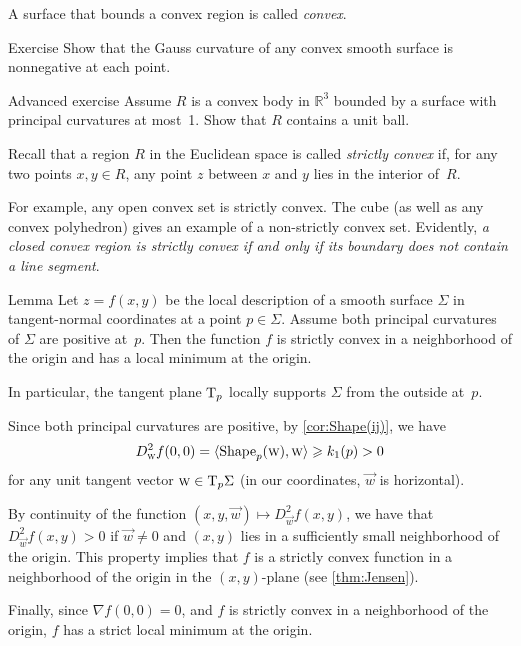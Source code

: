 A surface that bounds a convex region is called \emph{convex}.

\begin{thm}{Exercise}\label{ex:convex-surf}
Show that the Gauss curvature of any convex smooth surface is nonnegative at each point.
\end{thm}

\begin{thm}{Advanced exercise}\label{ex:convex-lagunov}
Assume $R$ is a convex body in $\mathbb{R}^3$ bounded by a surface with principal curvatures at most~1.
Show that $R$ contains a unit ball.
\end{thm}

Recall that a region $R$ in the Euclidean space is called  {}\emph{strictly convex} if, for any two points $x,y\in R$, any point $z$ between $x$ and $y$ lies in the interior of~$R$.

For example, any open convex set is strictly convex.
The cube (as well as any convex polyhedron) gives an example of a non-strictly convex set.
Evidently, \textit{a closed convex region is strictly convex if and only if its boundary does not contain a line segment}.



\begin{thm}{Lemma}\label{lem:gauss+=>convexity}
Let $z=f(x,y)$ be the local description of a smooth surface $\Sigma$ in tangent-normal coordinates at a point $p\in\Sigma$.
Assume both principal curvatures of $\Sigma$ are positive at~$p$.
Then the function $f$ is strictly convex in a neighborhood of the origin and has a local minimum at the origin.

In particular, the tangent plane $\mathrm{T}_p$ locally supports $\Sigma$ from the outside at~$p$.
\end{thm}

Since both principal curvatures are positive, by \ref{cor:Shape(ij)}, we have 
\[D^2_{\text{\sc{w}}}f(0,0)=\langle \mathop{\rm Shape}\nolimits_p({\text{\sc{w}}}),{\text{\sc{w}}}\rangle\geqslant k_1(p)>0\] 
for any unit tangent vector ${\text{\sc{w}}}\in\mathrm{T}_p\Sigma$ (in our coordinates, ${\vec w}$ is horizontal).

By continuity of the function $(x,y,{\vec w})\mapsto D^2_{\vec w}f(x,y)$,
we have that $D^2_{\vec w}f(x,y)>0$ if $\vec w\ne 0$ and $(x,y)$ lies in a sufficiently small neighborhood of the origin.
This property implies that $f$ is a strictly convex function in a neighborhood of the origin in the $(x,y)$-plane (see \ref{thm:Jensen}).

Finally, since $\nabla f(0,0)=0$, and $f$ is strictly convex in a neighborhood of the origin, $f$ has a strict local minimum at the origin.
\qeds

